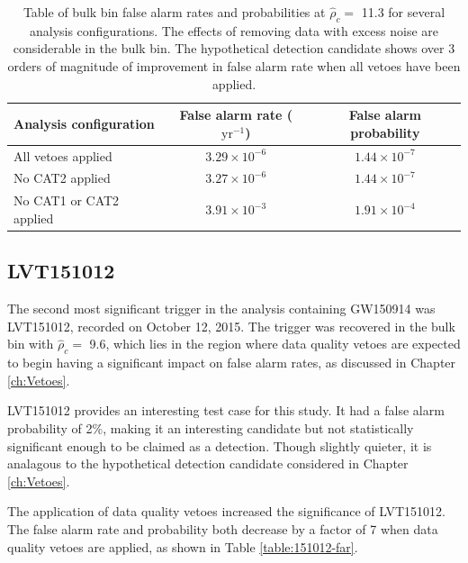 \begin{table}[!ht]%
  \begin{center}
    \begin{tabular}{lcc}
      \hline
      Analysis configuration & False alarm rate ($\mathrm{yr}^{-1}$) & False alarm probability \\ \hline
      All vetoes applied & $3.29\times10^{-6}$ & $1.44\times10^{-7}$\\
      No CAT2 applied & $3.27\times10^{-6}$ & $1.44\times10^{-7}$ \\
      No CAT1 or CAT2 applied & $3.91\times10^{-3}$ & $1.91\times10^{-4}$ \\
      \hline
    \end{tabular}
  \end{center}
  \caption[Bulk bin FAR - GW150914 analysis]{Table of bulk bin false alarm rates and probabilities at $\hat{\rho}_{c} =$ 11.3 %
           for several analysis configurations. %
           The effects of removing data with excess noise are considerable in the %
           bulk bin. The hypothetical detection candidate %
           shows over 3 orders of magnitude of improvement in false alarm rate
           when all vetoes have been applied.
           }
  \label{table:bulk-far}
\end{table}

\subsection{LVT151012}\label{sec:LVT151012}
The second most significant trigger in the analysis containing GW150914 was LVT151012,
recorded on October 12, 2015.
The trigger was recovered in the bulk bin with $\hat{\rho}_{c} =$ 9.6, which lies in the region
where data quality vetoes are expected to begin having a significant impact on false alarm rates,
as discussed in Chapter \ref{ch:Vetoes}.

LVT151012 provides an interesting test case for this study. It had a
false alarm probability of 2\%, making it an interesting candidate but not
statistically significant enough to be claimed as a detection. Though slightly quieter, it is
analagous
to the hypothetical detection candidate considered in Chapter \ref{ch:Vetoes}.

The application of data quality vetoes increased the significance of LVT151012.
The false alarm rate and probability both decrease by a factor of 7 when data quality vetoes are
applied, as shown in Table \ref{table:151012-far}.

